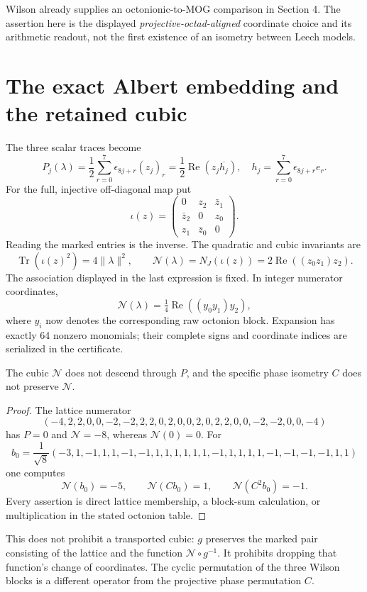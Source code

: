 Wilson already supplies an octonionic-to-MOG comparison in Section 4. The assertion here is the displayed \emph{projective-octad-aligned} coordinate choice and its arithmetic readout, not the first existence of an isometry between Leech models.

\section{The exact Albert embedding and the retained cubic}
The three scalar traces become
\begin{equation}\label{eq:traces}
P_j(\lambda)=\frac12\sum_{r=0}^7\epsilon_{8j+r}(z_j)_r
=\frac12\operatorname{Re}(z_j\overline{h_j}),\quad
h_j=\sum_{r=0}^7\epsilon_{8j+r}e_r.
\end{equation}
For the full, injective off-diagonal map put
\[
\iota(z)=\begin{pmatrix}0&z_2&\bar z_1\\\bar z_2&0&z_0\\z_1&\bar z_0&0\end{pmatrix}.
\]
Reading the marked entries is the inverse. The quadratic and cubic invariants are
\[
\operatorname{Tr}(\iota(z)^2)=4\|\lambda\|^2,\qquad
\mathcal N(\lambda)=N_J(\iota(z))=2\operatorname{Re}((z_0z_1)z_2).
\]
The association displayed in the last expression is fixed. In integer numerator coordinates,
\[
\mathcal N(\lambda)=\tfrac14\operatorname{Re}((y_0y_1)y_2),
\]
where $y_i$ now denotes the corresponding raw octonion block. Expansion has exactly 64 nonzero monomials; their complete signs and coordinate indices are serialized in the certificate.

\begin{proposition}\label{prop:cubic}
The cubic $\mathcal N$ does not descend through $P$, and the specific phase isometry $C$ does not preserve $\mathcal N$.
\end{proposition}
\begin{proof}
The lattice numerator
\[
(-4,2,2,0,0,-2,-2,2,2,0,2,0,0,2,0,2,2,0,0,-2,-2,0,0,-4)
\]
has $P=0$ and $\mathcal N=-8$, whereas $\mathcal N(0)=0$. For
\[
b_0=\frac1{\sqrt8}(-3,1,-1,1,1,-1,-1,1,1,1,1,1,1,-1,1,1,1,1,-1,-1,-1,-1,1,1)
\]
one computes
\[
\mathcal N(b_0)=-5,\qquad\mathcal N(Cb_0)=1,\qquad\mathcal N(C^2b_0)=-1.
\]
Every assertion is direct lattice membership, a block-sum calculation, or multiplication in the stated octonion table.
\end{proof}
This does not prohibit a transported cubic: $g$ preserves the marked pair consisting of the lattice and the function $\mathcal N\circ g^{-1}$. It prohibits dropping that function's change of coordinates. The cyclic permutation of the three Wilson blocks is a different operator from the projective phase permutation $C$.

